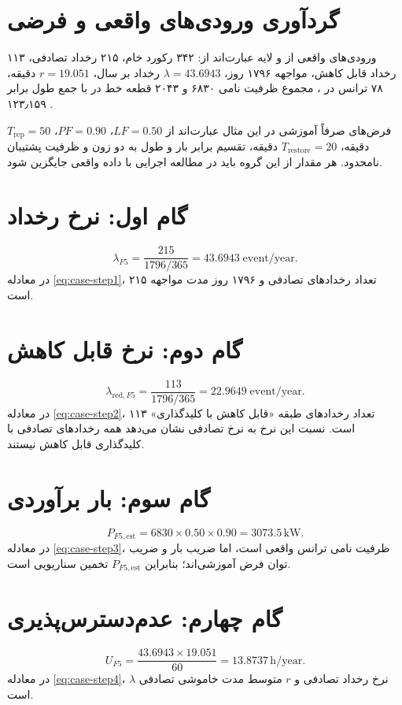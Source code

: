 \documentclass[11pt,a4paper,oneside]{book}
\newcommand{\file}[1]{\lr{\texttt{#1}}}
\newcommand{\code}[1]{\lr{\texttt{#1}}}
\newcommand{\unit}[1]{\,\mathrm{#1}}
\begin{document}
\section{گردآوری ورودی‌های واقعی و فرضی}
ورودی‌های واقعی از \file{5.xlsx} و لایه  عبارت‌اند از: ۳۴۲ رکورد خام، ۲۱۵ رخداد تصادفی، ۱۱۳ رخداد قابل کاهش، مواجهه ۱۷۹۶ روز، $\lambda=43.6943$ رخداد بر سال، $r=19.051$ دقیقه، ۷۸ ترانس در \code{ELWDTR}، مجموع ظرفیت نامی ۶۸۳۰  و ۲۰۴۳ قطعه خط در \code{ELWOML} با جمع طول \code{Shape\_STLe} برابر ۱۲۳٫۱۵۹ .

فرض‌های صرفاً آموزشی در این مثال عبارت‌اند از $LF=0.50$، $PF=0.90$، $T_{\mathrm{rep}}=50$ دقیقه، $T_{\mathrm{restore}}=20$ دقیقه، تقسیم برابر بار و طول به دو زون و ظرفیت پشتیبان نامحدود. هر مقدار از این گروه باید در مطالعه اجرایی با داده واقعی جایگزین شود.

\section{گام اول: نرخ رخداد}
\begin{equation}
 \lambda_{F5}=\frac{215}{1796/365}=43.6943\;\mathrm{event/year}.
 \label{eq:case-step1}
\end{equation}
در معادله \eqref{eq:case-step1}، ۲۱۵ تعداد رخدادهای تصادفی و ۱۷۹۶ روز مدت مواجهه است.

\section{گام دوم: نرخ قابل کاهش}
\begin{equation}
 \lambda_{\mathrm{red},F5}=\frac{113}{1796/365}=22.9649\;\mathrm{event/year}.
 \label{eq:case-step2}
\end{equation}
در معادله \eqref{eq:case-step2}، ۱۱۳ تعداد رخدادهای طبقه «قابل کاهش با کلیدگذاری» است. نسبت این نرخ به نرخ تصادفی نشان می‌دهد همه رخدادهای تصادفی با کلیدگذاری قابل کاهش نیستند.

\section{گام سوم: بار برآوردی}
\begin{equation}
 P_{F5,\mathrm{est}}=6830\times0.50\times0.90=3073.5\unit{kW}.
 \label{eq:case-step3}
\end{equation}
در معادله \eqref{eq:case-step3}، ظرفیت نامی ترانس واقعی است، اما ضریب بار و ضریب توان فرض آموزشی‌اند؛ بنابراین $P_{F5,\mathrm{est}}$ تخمین سناریویی است.

\section{گام چهارم: عدم‌دسترس‌پذیری}
\begin{equation}
 U_{F5}=\frac{43.6943\times19.051}{60}=13.8737\unit{h/year}.
 \label{eq:case-step4}
\end{equation}
در معادله \eqref{eq:case-step4}، $\lambda$ نرخ رخداد تصادفی و $r$ متوسط مدت خاموشی تصادفی است.
\end{document}
